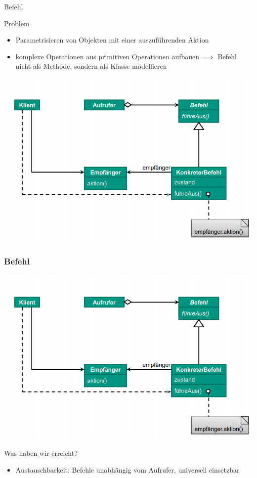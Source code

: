 \documentclass[18pt]{beamer}
\begin{document}
	\begin{frame}{Befehl}
		\begin{block}{Problem}
			\begin{itemize}
				\item Parametrisieren von Objekten mit einer auszuführenden Aktion \pause 
				\item komplexe Operationen aus primitiven Operationen aufbauen \pause
				\linebreak $\implies$ Befehl nicht als Methode, sondern als Klasse modellieren
			\end{itemize}
		\end{block}
		\pause
		\centering
		\includegraphics[scale=0.35]{./pics/tut4/command.png}
	\end{frame}

	\begin{frame}
		\frametitle{Befehl}
		\includegraphics[scale=0.35]{./pics/tut4/command.png}
		\begin{block}{Was haben wir erreicht?}
			\begin{itemize}
				 \pause
				\item Austauschbarkeit: Befehle unabhängig vom Aufrufer, universell einsetzbar
			\end{itemize}
		\end{block}
	\end{frame}
	
\end{document}
